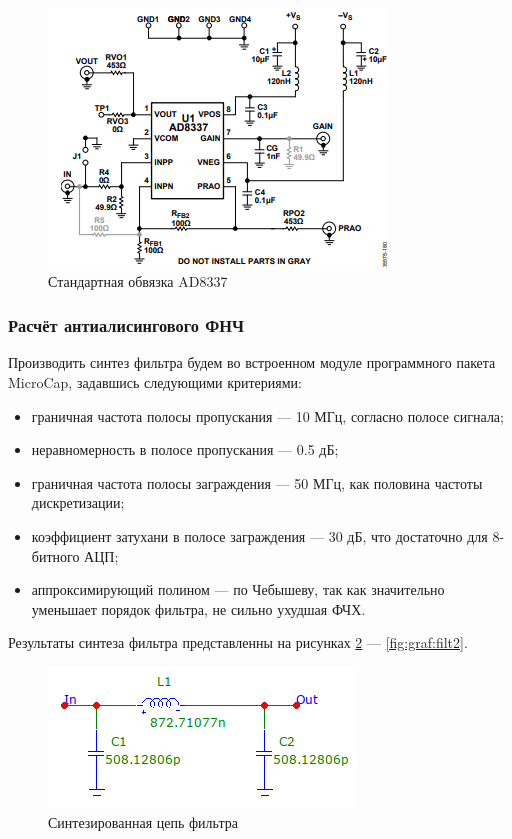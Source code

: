 \documentclass[utf8x, 14pt, oneside, a4paper]{article}
\begin{document}
				\begin{figure}[H]
					\centering
					\includegraphics[width=0.7\linewidth]{"Рисунки/Доки/AD8337"}
					\caption{Стандартная обвязка AD8337}
					\label{fig:doc:AD8337}
				\end{figure}
				
			\subsubsection{Расчёт антиалисингового ФНЧ}
				Производить синтез фильтра будем во встроенном модуле программного пакета MicroCap, задавшись следующими критериями:
				
				\begin{itemize}
					\item граничная частота полосы пропускания --- 10 МГц, согласно полосе сигнала;
					\item неравномерность в полосе пропускания --- 0.5 дБ;
					\item граничная частота полосы заграждения --- 50 МГц, как половина частоты дискретизации;
					\item коэффициент затухани в полосе заграждения --- 30 дБ, что достаточно для 8-битного АЦП;
					\item аппроксимирующий полином --- по Чебышеву, так как значительно уменьшает порядок фильтра, не сильно ухудшая ФЧХ.
				\end{itemize}
			
				\vspace{\baselineskip}
			
				Результаты синтеза фильтра представленны на рисунках \ref{fig:graf:filt0} --- \ref{fig:graf:filt2}.
			
				\begin{figure}[H]
					\centering
					\includegraphics[width=0.7\linewidth]{"Рисунки/Схемы/Фильтр"}
					\caption{Синтезированная цепь фильтра}
					\label{fig:graf:filt0}
				\end{figure}
				
\end{document}
